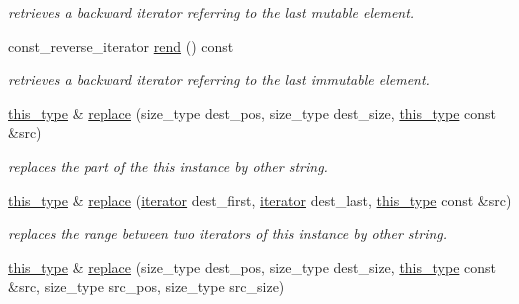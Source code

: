 \begin{DoxyCompactItemize}
\begin{DoxyCompactList}\small\item\em retrieves a backward iterator referring to the last mutable element. \end{DoxyCompactList}\item 
\hypertarget{classhryky_1_1_string_a56ea9c056ff22effb3a3f882310be9f0}{const\-\_\-reverse\-\_\-iterator \hyperlink{classhryky_1_1_string_a56ea9c056ff22effb3a3f882310be9f0}{rend} () const }\label{classhryky_1_1_string_a56ea9c056ff22effb3a3f882310be9f0}

\begin{DoxyCompactList}\small\item\em retrieves a backward iterator referring to the last immutable element. \end{DoxyCompactList}\item 
\hypertarget{classhryky_1_1_string_a09705c9ae9b2a6eb030421830be1a6ad}{\hyperlink{classhryky_1_1_string}{this\-\_\-type} \& \hyperlink{classhryky_1_1_string_a09705c9ae9b2a6eb030421830be1a6ad}{replace} (size\-\_\-type dest\-\_\-pos, size\-\_\-type dest\-\_\-size, \hyperlink{classhryky_1_1_string}{this\-\_\-type} const \&src)}\label{classhryky_1_1_string_a09705c9ae9b2a6eb030421830be1a6ad}

\begin{DoxyCompactList}\small\item\em replaces the part of the this instance by other string. \end{DoxyCompactList}\item 
\hypertarget{classhryky_1_1_string_af3bde22af32eb64c88f9cf70ba00a7df}{\hyperlink{classhryky_1_1_string}{this\-\_\-type} \& \hyperlink{classhryky_1_1_string_af3bde22af32eb64c88f9cf70ba00a7df}{replace} (\hyperlink{classhryky_1_1iterator_1_1random_1_1_mutable}{iterator} dest\-\_\-first, \hyperlink{classhryky_1_1iterator_1_1random_1_1_mutable}{iterator} dest\-\_\-last, \hyperlink{classhryky_1_1_string}{this\-\_\-type} const \&src)}\label{classhryky_1_1_string_af3bde22af32eb64c88f9cf70ba00a7df}

\begin{DoxyCompactList}\small\item\em replaces the range between two iterators of this instance by other string. \end{DoxyCompactList}\item 
\hypertarget{classhryky_1_1_string_af4b644fb8a0862e04f5ff123b7578ee6}{\hyperlink{classhryky_1_1_string}{this\-\_\-type} \& \hyperlink{classhryky_1_1_string_af4b644fb8a0862e04f5ff123b7578ee6}{replace} (size\-\_\-type dest\-\_\-pos, size\-\_\-type dest\-\_\-size, \hyperlink{classhryky_1_1_string}{this\-\_\-type} const \&src, size\-\_\-type src\-\_\-pos, size\-\_\-type src\-\_\-size)}\label{classhryky_1_1_string_af4b644fb8a0862e04f5ff123b7578ee6}


\end{DoxyCompactItemize}

